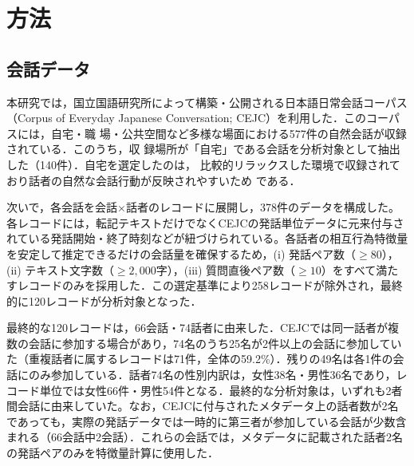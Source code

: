 \documentclass[dvipdfmx,11pt,a4paper]{bxjsarticle}
\renewcommand{\_}{\paperorigunderscore\allowbreak}%
\begin{document}
\section{方法}

\subsection{会話データ}
\label{sec:data}

本研究では，国立国語研究所によって構築・公開される日本語日常会話コーパス（Corpus
of Everyday Japanese Conversation; CEJC）を利用した．このコーパスには，自宅・職
場・公共空間など多様な場面における577件の自然会話が収録されている．このうち，収
録場所が「自宅」である会話を分析対象として抽出した（140件）．自宅を選定したのは，
比較的リラックスした環境で収録されており話者の自然な会話行動が反映されやすいため
である．


次いで，各会話を会話$\times$話者のレコードに展開し，378件のデータを構成した。各レコードには，転記テキストだけでなくCEJCの発話単位データに元来付与されている発話開始・終了時刻などが紐づけられている。各話者の相互行為特徴量を安定して推定できるだけの会話量を確保するため，(i) 発話ペア数（$\geq 80$），(ii) テキスト文字数（$\geq 2{,}000$字），(iii) 質問直後ペア数（$\geq 10$）をすべて満たすレコードのみを採用した．この選定基準により258レコードが除外され，最終的に120レコードが分析対象となった．





最終的な120レコードは，66会話・74話者に由来した．CEJCでは同一話者が複数の会話に参加する場合があり，74名のうち25名が2件以上の会話に参加していた（重複話者に属するレコードは71件，全体の59.2\%）．残りの49名は各1件の会話にのみ参加している．話者74名の性別内訳は，女性38名・男性36名であり，レコード単位では女性66件・男性54件となる．最終的な分析対象は，いずれも2者間会話に由来していた。なお，CEJCに付与されたメタデータ上の話者数が2名であっても，実際の発話データでは一時的に第三者が参加している会話が少数含まれる（66会話中2会話）．これらの会話では，メタデータに記載された話者2名の発話ペアのみを特徴量計算に使用した．
\end{document}
